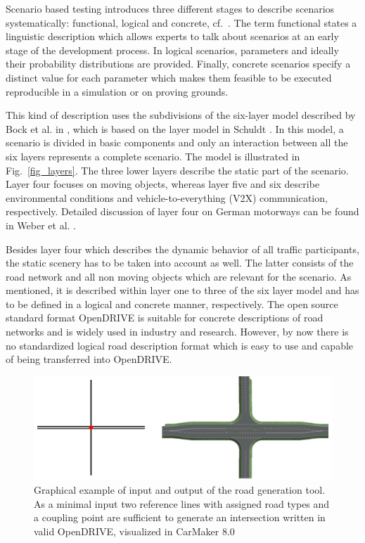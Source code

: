 \documentclass[a4paper, 10pt, conference]{ieeeconf}      %
\begin{document}
Scenario based testing introduces three different stages to describe scenarios systematically: functional, logical and concrete, cf.~\cite{menzel2018scenarios}. The term functional states a linguistic description which allows experts to talk about scenarios at an early stage of the development process. In logical scenarios, parameters and ideally their probability distributions are provided. Finally, concrete scenarios specify a distinct value for each parameter which makes them feasible to be executed reproducible in a simulation or on proving grounds. 

This kind of description uses the subdivisions of the six-layer model described by Bock et al. in \cite{bock2018data}, which is based on the layer model in Schuldt \cite{schuldt2017beitrag}. In this model, a scenario is divided in basic components and only an interaction between all the six layers represents a complete scenario. The model is illustrated in Fig.~\ref{fig_layers}. The three lower layers describe the static part of the scenario. Layer four focuses on moving objects, whereas layer five and six describe environmental conditions and vehicle-to-everything (V2X) communication, respectively. Detailed discussion of layer four on German motorways can be found in Weber et al. \cite{weber2019framework}.

Besides layer four which describes the dynamic behavior of all traffic participants, the static scenery has to be taken into account as well. The latter consists of the road network and all non moving objects which are relevant for the scenario. As mentioned, it is described within layer one to three of the six layer model and has to be defined in a logical and concrete manner, respectively. The open source standard format OpenDRIVE \cite{odr1.5} is suitable for concrete descriptions of road networks and is widely used in industry and research. However, by now there is no standardized logical road description format which is easy to use and capable of being transferred into OpenDRIVE.
\begin{figure}[t] 		
	\centering
	\includegraphics{fig/motivation.png}
	\caption[dummy]{Graphical example of input and output of the road generation tool. As a minimal input two reference lines with assigned road types and a coupling point are sufficient to generate an intersection written in valid OpenDRIVE, visualized in CarMaker 8.0\footnotemark}
	\label{fig_motivation}
\end{figure}
\end{document}
